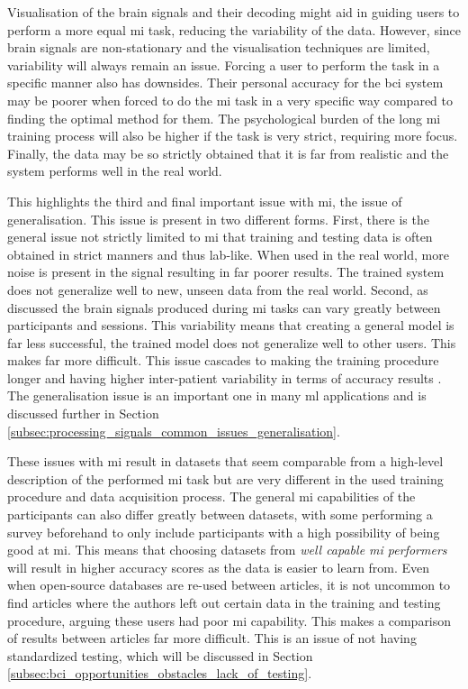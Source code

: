 Visualisation of the brain signals and their decoding might aid in guiding users to perform a more equal \gls{mi} task, reducing the variability of the data.
However, since brain signals are non-stationary and the visualisation techniques are limited, variability will always remain an issue.
Forcing a user to perform the task in a specific manner also has downsides.
Their personal accuracy for the \gls{bci} system may be poorer when forced to do the \gls{mi} task in a very specific way compared to finding the optimal method for them.
The psychological burden of the long \gls{mi} training process will also be higher if the task is very strict, requiring more focus.
Finally, the data may be so strictly obtained that it is far from realistic and the system performs well in the real world.

This highlights the third and final important issue with \gls{mi}, the issue of generalisation.
This issue is present in two different forms.
First, there is the general issue not strictly limited to \gls{mi} that training and testing data is often obtained in strict manners and thus lab-like.
When used in the real world, more noise is present in the signal resulting in far poorer results.
The trained system does not generalize well to new, unseen data from the real world.
Second, as discussed the brain signals produced during \gls{mi} tasks can vary greatly between participants and sessions.
This variability means that creating a general model is far less successful, the trained model does not generalize well to other users.
This makes  far more difficult.
This issue cascades to making the training procedure longer and having higher inter-patient variability in terms of accuracy results \citep{cheap_bci_feasibility, mi_training_hard}.
The generalisation issue is an important one in many \gls{ml} applications and is discussed further in Section \ref{subsec:processing_signals_common_issues_generalisation}.

These issues with \gls{mi} result in datasets that seem comparable from a high-level description of the performed \gls{mi} task but are very different in the used training procedure and data acquisition process.
The general \gls{mi} capabilities of the participants can also differ greatly between datasets, with some performing a survey beforehand to only include participants with a high possibility of being good at \gls{mi}.
This means that choosing datasets from \textit{well capable \gls{mi} performers} will result in higher accuracy scores as the data is easier to learn from.
Even when open-source databases are re-used between articles, it is not uncommon to find articles where the authors left out certain data in the training and testing procedure, arguing these users had poor \gls{mi} capability.
This makes a comparison of results between articles far more difficult.
This is an issue of not having standardized testing, which will be discussed in Section \ref{subsec:bci_opportunities_obstacles_lack_of_testing}.


